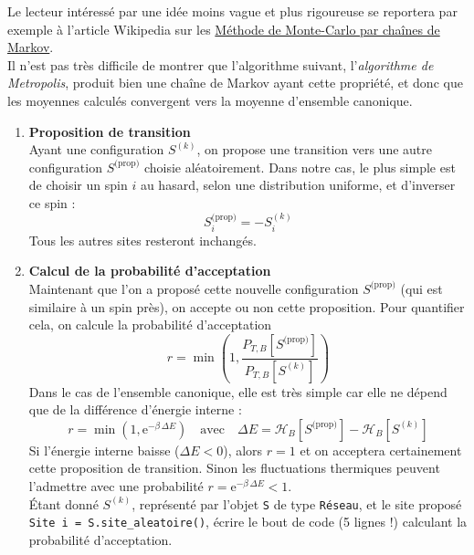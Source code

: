 \documentclass{book}
\newcommand{\inline}[1]{\texttt{#1}}
\begin{document}
Le lecteur intéressé par une idée moins vague et plus rigoureuse se reportera par exemple à l'article Wikipedia sur les \href{https://fr.wikipedia.org/wiki/M%C3%A9thode_de_Monte-Carlo_par_cha%C3%AEnes_de_Markov}{Méthode de Monte-Carlo par chaînes de Markov}.\\

Il n'est pas très difficile de montrer que l'algorithme suivant, l'\emph{algorithme de Metropolis}, produit bien une chaîne de Markov ayant cette propriété, et donc que les moyennes calculés convergent vers la moyenne d'ensemble canonique.\\

\begin{enumerate}
  \item \textbf{Proposition de transition}\\
  Ayant une configuration $S^{(k)}$, on propose une transition vers une autre configuration $S^\text{(prop)}$ choisie aléatoirement. Dans notre cas, le plus simple est de choisir un spin $i$ au hasard, selon une distribution uniforme, et d'inverser ce spin :
  \begin{equation*}
    S^\text{(prop)}_i = -S^{(k)}_i
  \end{equation*}
  Tous les autres sites resteront inchangés.\\

  \item \textbf{Calcul de la probabilité d’acceptation}\\
  Maintenant que l'on a proposé cette nouvelle configuration $S^\text{(prop)}$ (qui est similaire à un spin près), on accepte ou non cette proposition. Pour quantifier cela, on calcule la probabilité d’acceptation
  \begin{equation*}
    r = \min\left( 1, \frac{P_{T,B}[S^\text{(prop)}]}{P_{T,B}[S^{(k)}]} \right)
  \end{equation*}
  Dans le cas de l'ensemble canonique, elle est très simple car elle ne dépend que de la différence d'énergie interne :
  \begin{equation*}
    r = \min\left( 1, \mathrm{e}^{-\beta\,\Delta E} \right) \quad \text{avec} \quad \Delta E = \mathcal{H}_B[S^\text{(prop)}]-\mathcal{H}_B[S^{(k)}]
  \end{equation*}
  Si l’énergie interne baisse ($\Delta E < 0$), alors $r=1$ et on acceptera certainement cette proposition de transition. Sinon les fluctuations thermiques peuvent l'admettre avec une probabilité $r = \mathrm{e}^{-\beta\,\Delta E} < 1$.\\Étant donné $S^{(k)}$, représenté par l'objet \inline{S} de type \inline{Réseau}, et le site proposé \inline{Site i = S.site_aleatoire()}, écrire le bout de code (5 lignes !) calculant la probabilité d'acceptation.\\


\end{enumerate}
\end{document}
